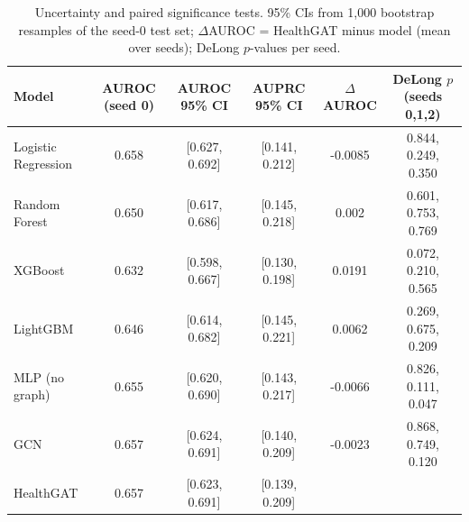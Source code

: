 \begin{table}[t]\centering\caption{Uncertainty and paired significance tests. 95\% CIs from 1{,}000 bootstrap resamples of the seed-0 test set; $\Delta$AUROC = HealthGAT minus model (mean over seeds); DeLong $p$-values per seed.}\label{tab:sig}
\begin{tabular}{lccccc}\toprule
Model & AUROC (seed 0) & AUROC 95\% CI & AUPRC 95\% CI & $\Delta$AUROC & DeLong $p$ (seeds 0,1,2) \\\midrule
Logistic Regression & 0.658 & [0.627, 0.692] & [0.141, 0.212] & -0.0085 & 0.844, 0.249, 0.350 \\
Random Forest & 0.650 & [0.617, 0.686] & [0.145, 0.218] & 0.002 & 0.601, 0.753, 0.769 \\
XGBoost & 0.632 & [0.598, 0.667] & [0.130, 0.198] & 0.0191 & 0.072, 0.210, 0.565 \\
LightGBM & 0.646 & [0.614, 0.682] & [0.145, 0.221] & 0.0062 & 0.269, 0.675, 0.209 \\
MLP (no graph) & 0.655 & [0.620, 0.690] & [0.143, 0.217] & -0.0066 & 0.826, 0.111, 0.047 \\
GCN & 0.657 & [0.624, 0.691] & [0.140, 0.209] & -0.0023 & 0.868, 0.749, 0.120 \\
HealthGAT & 0.657 & [0.623, 0.691] & [0.139, 0.209] &  &  \\
\bottomrule\end{tabular}\end{table}
